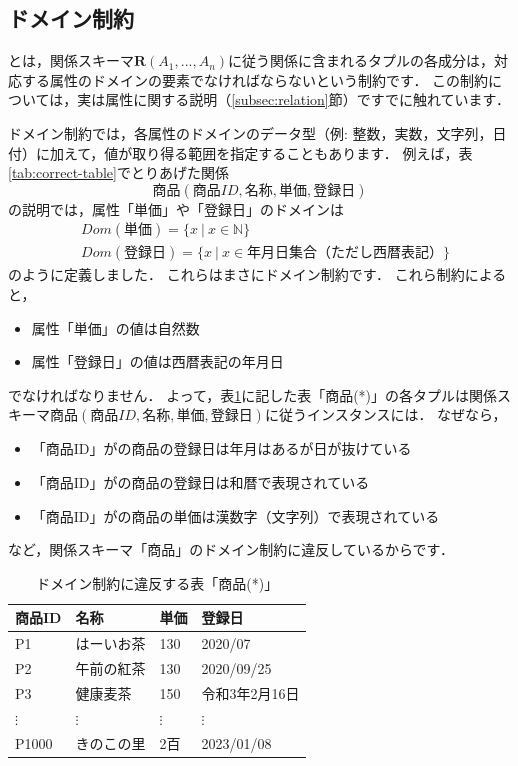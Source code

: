\subsection{ドメイン制約}
 とは，関係スキーマ$\boldsymbol{R}(A_1, ..., A_n)$に従う関係に含まれるタプルの各成分は，対応する属性のドメインの要素でなければならないという制約です．
この制約については，実は属性に関する説明（\ref{subsec:relation}節）ですでに触れています．

ドメイン制約では，各属性のドメインのデータ型（例: 整数，実数，文字列，日付）に加えて，値が取り得る範囲を指定することもあります．
例えば，表\ref{tab:correct-table}でとりあげた関係
\begin{equation}
\textbf{商品}(商品ID, 名称, 単価, 登録日)
\end{equation}
の説明では，属性「単価」や「登録日」のドメインは
\begin{align}
&Dom(単価) = \{ x \ | \ x \in \mathbb{N} \} \\
&Dom(登録日) = \{ x \ | \ x \in 年月日集合（ただし西暦表記） \}
\end{align}
のように定義しました．
これらはまさにドメイン制約です．
これら制約によると，
\begin{itemize}
\item 属性「単価」の値は自然数
\item 属性「登録日」の値は西暦表記の年月日
\end{itemize}
でなければなりません．
よって，表\ref{tab:incorrect-table}に記した表「商品(*)」の各タプルは関係スキーマ$\textbf{商品}(商品ID, 名称, 単価, 登録日)$に従うインスタンスには．
なぜなら，
\begin{itemize}
\item 「商品ID」がの商品の登録日は年月はあるが日が抜けている
\item 「商品ID」がの商品の登録日は和暦で表現されている
\item 「商品ID」がの商品の単価は漢数字（文字列）で表現されている
\end{itemize}
など，関係スキーマ「商品」のドメイン制約に違反しているからです．

\begin{table}[!htbp]
\centering
\caption{ドメイン制約に違反する表「商品(*)」}
\label{tab:incorrect-table}
\begin{tabular}{@{}llll@{}}
\toprule
\textbf{商品ID} & \textbf{名称} & \textbf{単価} & \textbf{登録日} \\ \midrule
P1            & はーいお茶       & 130         & 2020/07   \\
P2            & 午前の紅茶       & 130         & 2020/09/25   \\
P3            & 健康麦茶        & 150         & 令和3年2月16日   \\
$\vdots$      & $\vdots$    & $\vdots$    & $\vdots$     \\
P1000         & きのこの里       & 2百         & 2023/01/08   \\ \bottomrule
\end{tabular}
\end{table}


